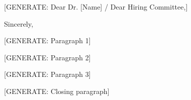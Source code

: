 \documentclass[11pt,letterpaper,roman]{moderncv}
\begin{document}
\date{\today}
\opening{[GENERATE: Dear Dr. [Name] / Dear Hiring Committee,]}
\closing{Sincerely,}
\makelettertitle

\begin{justify}
[GENERATE: Paragraph 1]

[GENERATE: Paragraph 2]

[GENERATE: Paragraph 3]

[GENERATE: Closing paragraph]
\end{justify}

\makeletterclosing
\end{document}
